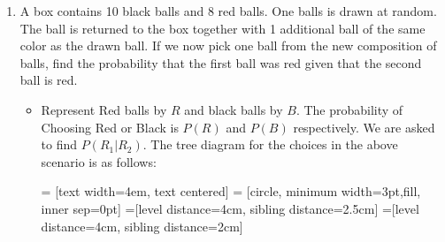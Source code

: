 \documentclass{article}
\begin{document}
\begin{enumerate}
\begin{enumerate}
\begin{itemize}
        \end{itemize}
    \end{enumerate}
\item A box contains 10 black balls and 8 red balls. One balls is drawn at random. The ball is returned to the box together with 1 additional ball of the same color as the drawn ball. If we now pick one ball from the new composition of balls, find the probability that the first ball was red given that the second ball is red.
    \begin{itemize}
    \item Represent Red balls by $R$ and black balls by $B$. The probability of Choosing Red or Black is $P(R)$ and $P(B)$ respectively. We are asked to find $P(R_1|R_2)$. The tree diagram for the choices in the above scenario is as follows:\par
    \begin{minipage}{\linewidth}
        \centering
         = [text width=4em, text centered]
         = [circle, minimum width=3pt,fill, inner sep=0pt]
        =[level distance=4cm, sibling distance=2.5cm]
        =[level distance=4cm, sibling distance=2cm]


\end{minipage}
\end{itemize}
\end{enumerate}
\end{document}
